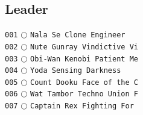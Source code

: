 \documentclass[a4paper,landscape]{article}
\begin{document}
\fontsize{8}{8}\selectfont

\begin{multicols*}{5}
    \section{Leader} 
\vspace{-2mm} 
\texttt{001} \(\bigcirc\)  \texttt{Nala Se Clone Engineer} \vspace{-0.3mm}\\ 
\texttt{002} \(\bigcirc\)  \texttt{Nute Gunray Vindictive Vi} \vspace{-0.3mm}\\ 
\texttt{003} \(\bigcirc\)  \texttt{Obi-Wan Kenobi Patient Me} \vspace{-0.3mm}\\ 
\texttt{004} \(\bigcirc\)  \texttt{Yoda Sensing Darkness} \vspace{-0.3mm}\\ 
\texttt{005} \(\bigcirc\)  \texttt{Count Dooku Face of the C} \vspace{-0.3mm}\\ 
\texttt{006} \(\bigcirc\)  \texttt{Wat Tambor Techno Union F} \vspace{-0.3mm}\\ 
\texttt{007} \(\bigcirc\)  \texttt{Captain Rex Fighting For } \vspace{-0.3mm}\\ 

\end{multicols*}
\end{document}
